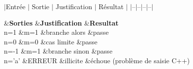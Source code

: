
\begin{DoxyRefList}
\item[\label{test__test000002}%
\hypertarget{test__test000002}{}%
Membre \hyperlink{tp1-2_8cpp_a293a7e040a686ef8e011c2382f384ebe}{inserer} (float tab\mbox{[}\mbox{]}, unsigned int \&nbelem, unsigned int taille, float r, unsigned int pos)]$\vert$\+Entrée $\vert$ Sortie $\vert$ Justification $\vert$ Résultat $\vert$ $\vert$--$\vert$--$\vert$--$\vert$--$\vert$  
\item[\label{test__test000001}%
\hypertarget{test__test000001}{}%
Membre \hyperlink{tp1-1_8cpp_ae66f6b31b5ad750f1fe042a706a4e3d4}{main} ()]\begin{TabularC}{4}
\hline
{}&{\bf Sorties }&{\bf Justification }&{\bf Resultat  }\\
n=1 &m=1 &branche alors &passe \\
n=0 &m=0 &cas limite &passe \\
n=-\/1 &m=1 &branche sinon &passe \\
n='a' &E\+R\+R\+E\+U\+R &illicite &échoue (problème de saisie C++) \\
\end{TabularC}

\end{DoxyRefList}